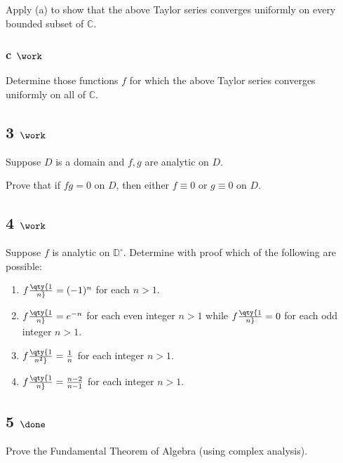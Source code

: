 Apply (a) to show that the above Taylor series converges uniformly on
every bounded subset of \({\mathbb{C}}\).

\hypertarget{c-work-4}{%
\subsubsection{\texorpdfstring{c
\(\work\)}{c \textbackslash work}}\label{c-work-4}}

Determine those functions \(f\) for which the above Taylor series
converges uniformly on all of \({\mathbb{C}}\).

\hypertarget{work-36}{%
\subsection{\texorpdfstring{3
\(\work\)}{3 \textbackslash work}}\label{work-36}}

Suppose \(D\) is a domain and \(f, g\) are analytic on \(D\).

Prove that if \(fg = 0\) on \(D\), then either \(f \equiv 0\) or
\(g\equiv 0\) on \(D\).

\hypertarget{work-37}{%
\subsection{\texorpdfstring{4
\(\work\)}{4 \textbackslash work}}\label{work-37}}

Suppose \(f\) is analytic on \({\mathbb{D}}^\circ\). Determine with
proof which of the following are possible:

\begin{enumerate}
\def\labelenumi{\alph{enumi}.}
\item
  \(f\qty{1\over n} = (-1)^n\) for each \(n>1\).
\item
  \(f\qty{1\over n} = e^{-n}\) for each even integer \(n>1\) while
  \(f\qty{1\over n} = 0\) for each odd integer \(n>1\).
\item
  \(f\qty{1\over n^2} = {1\over n}\) for each integer \(n>1\).
\item
  \(f\qty{1\over n} = {n-2 \over n-1}\) for each integer \(n>1\).
\end{enumerate}

\hypertarget{done-4}{%
\subsection{\texorpdfstring{5
\(\done\)}{5 \textbackslash done}}\label{done-4}}

Prove the Fundamental Theorem of Algebra (using complex analysis).

